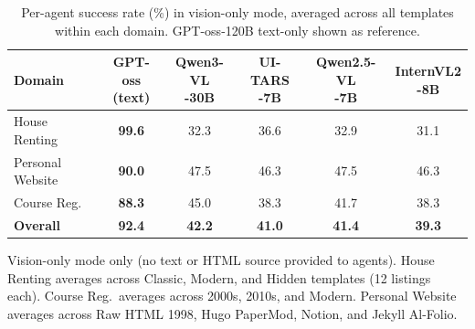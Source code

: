 \documentclass[10pt]{article}
\newcommand{\tmo}[1]{\textbf{#1}}   %
\begin{document}
\begin{table}[ht]
\centering
\caption{%
  Per-agent success rate (\%) in vision-only mode, averaged across all
  templates within each domain. GPT-oss-120B text-only shown as reference.
}
\label{tab:per-agent-sr}
\renewcommand{\arraystretch}{1.20}
\setlength{\tabcolsep}{7pt}

\begin{tabular}{l c c c c c}
\toprule
\textbf{Domain} &
\makecell{\textbf{GPT-oss}\\\textbf{(text)}} &
\makecell{\textbf{Qwen3-VL}\\\textbf{-30B}} &
\makecell{\textbf{UI-TARS}\\\textbf{-7B}} &
\makecell{\textbf{Qwen2.5-VL}\\\textbf{-7B}} &
\makecell{\textbf{InternVL2}\\\textbf{-8B}} \\
\midrule


House Renting    & \tmo{99.6} & 32.3 & 36.6 & 32.9 & 31.1 \\
Personal Website & \tmo{90.0} & 47.5 & 46.3 & 47.5 & 46.3 \\

Course Reg.      & \tmo{88.3} & 45.0 & 38.3 & 41.7 & 38.3 \\

\midrule[\heavyrulewidth]
\textbf{Overall} & \tmo{92.4} & \textbf{42.2} & \textbf{41.0} & \textbf{41.4} & \textbf{39.3} \\

\bottomrule
\end{tabular}

\smallskip
\noindent\footnotesize
Vision-only mode only (no text or HTML source provided to agents).
House Renting averages across Classic, Modern, and Hidden templates (12
listings each). Course Reg.\ averages across 2000s, 2010s, and Modern.
Personal Website averages across Raw HTML 1998, Hugo PaperMod, Notion,
and Jekyll Al-Folio.
\end{table}
\end{document}
